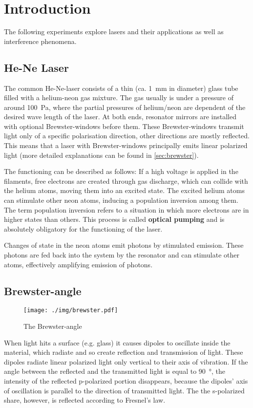 \chapter{Introduction}
The following experiments explore lasers and their applications as well as interference phenomena.

\section{He-Ne Laser}
The common He-Ne-laser consists of a thin (ca. \SI{1}{\milli\meter} in diameter) glass tube filled with a helium-neon gas mixture.
The gas usually is under a pressure of around \SI{100}{\pascal}, where the partial pressures of helium/neon are dependent of the desired wave length of the laser.
At both ends, resonator mirrors are installed with optional Brewster-windows before them.
These Brewster-windows transmit light only of a specific polarisation direction, other directions are mostly reflected.
This means that a laser with Brewster-windows principally emits linear polarized light (more detailed explanations can be found in \autoref{sec:brewster}).

The functioning can be described as follows:
If a high voltage is applied in the filaments, free electrons are created through gas discharge, which can collide with the helium atoms, moving them into an excited state.
The excited helium atoms can stimulate other neon atoms, inducing a population inversion among them.
The term population inversion refers to a situation in which more electrons are in higher states than others.
This process is called \textbf{optical pumping} and is absolutely obligatory for the functioning of the laser.

Changes of state in the neon atoms emit photons by stimulated emission.
These photons are fed back into the system by the resonator and can stimulate other atoms, effectively amplifying emission of photons.

\section{Brewster-angle}\label{sec:brewster}
\begin{figure}[tb]
	\centering
	\texttt{[image: ./img/brewster.pdf]}
	\caption[Brewster-angle]{The Brewster-angle}
\end{figure}
When light hits a surface (e.g. glass) it causes dipoles to oscillate inside the material, which radiate and so create reflection and transmission of light.
These dipoles radiate linear polarized light only vertical to their axis of vibration.
If the angle between the reflected and the transmitted light is equal to \SI{90}{\degree}, the intensity of the reflected p-polarized portion disappears, because the dipoles' axis of oscillation is parallel to the direction of transmitted light.
The the s-polarized share, however, is reflected according to Fresnel's law.

